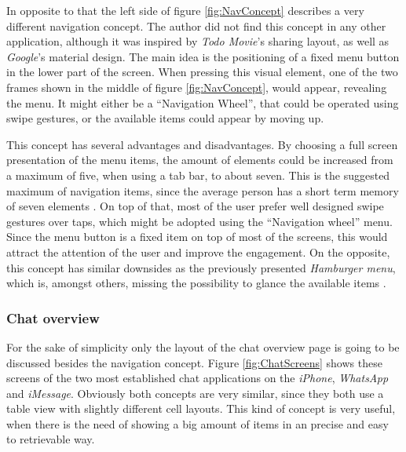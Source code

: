 In opposite to that the left side of figure \vref{fig:NavConcept} describes a very different navigation concept. The author did not find this concept in any other application, although it was inspired by \emph{Todo Movie}'s sharing layout, as well as \emph{Google}'s material design. The main idea is the positioning of a fixed menu button in the lower part of the screen. When pressing this visual element, one of the two frames shown in the middle of figure \vref{fig:NavConcept}, would appear, revealing the menu. It might either be a \enquote{Navigation Wheel}, that could be operated using swipe gestures, or the available items could appear by moving up.

This concept has several advantages and disadvantages. By choosing a full screen presentation of the menu items, the amount of elements could be increased from a maximum of five, when using a tab bar, to about seven. This is the suggested maximum of navigation items, since the average person has a short term memory of seven elements \cite{Crestodina:2015aa}. On top of that, most of the user prefer well designed swipe gestures over taps, which might be adopted using the \enquote{Navigation wheel} menu. Since the menu button is a fixed item on top of most of the screens, this would attract the attention of the user and improve the engagement. On the opposite, this concept has similar downsides as the previously presented \emph{Hamburger menu}, which is, amongst others, missing the possibility to glance the available items \cite{Abreu:2014aa}.

\subsubsection{Chat overview}
For the sake of simplicity only the layout of the chat overview page is going to be discussed besides the navigation concept. Figure \vref{fig:ChatScreens} shows these screens of the two most established chat applications on the \emph{iPhone}, \emph{WhatsApp} and \emph{iMessage}. Obviously both concepts are very similar, since they both use a table view with slightly different cell layouts. This kind of concept is very useful, when there is the need of showing a big amount of items in an precise and easy to retrievable way. 

